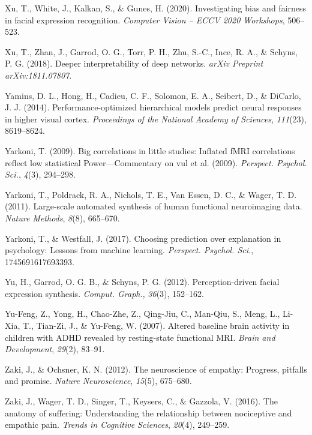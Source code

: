 \documentclass[11pt,american,a4paper,oneside,]{memoir} %
\begin{document}
\leavevmode\hypertarget{ref-Xu2020-jd}{}%
Xu, T., White, J., Kalkan, S., \& Gunes, H. (2020). Investigating bias and fairness in facial expression recognition. \emph{Computer Vision -- ECCV 2020 Workshops}, 506--523.

\leavevmode\hypertarget{ref-xu2018deeper}{}%
Xu, T., Zhan, J., Garrod, O. G., Torr, P. H., Zhu, S.-C., Ince, R. A., \& Schyns, P. G. (2018). Deeper interpretability of deep networks. \emph{arXiv Preprint arXiv:1811.07807}.

\leavevmode\hypertarget{ref-yamins2014performance}{}%
Yamins, D. L., Hong, H., Cadieu, C. F., Solomon, E. A., Seibert, D., \& DiCarlo, J. J. (2014). Performance-optimized hierarchical models predict neural responses in higher visual cortex. \emph{Proceedings of the National Academy of Sciences}, \emph{111}(23), 8619--8624.

\leavevmode\hypertarget{ref-Yarkoni2009-pz}{}%
Yarkoni, T. (2009). Big correlations in little studies: Inflated fMRI correlations reflect low statistical Power---Commentary on vul et al. (2009). \emph{Perspect. Psychol. Sci.}, \emph{4}(3), 294--298.

\leavevmode\hypertarget{ref-yarkoni2011large}{}%
Yarkoni, T., Poldrack, R. A., Nichols, T. E., Van Essen, D. C., \& Wager, T. D. (2011). Large-scale automated synthesis of human functional neuroimaging data. \emph{Nature Methods}, \emph{8}(8), 665--670.

\leavevmode\hypertarget{ref-Yarkoni2017-om}{}%
Yarkoni, T., \& Westfall, J. (2017). Choosing prediction over explanation in psychology: Lessons from machine learning. \emph{Perspect. Psychol. Sci.}, 1745691617693393.

\leavevmode\hypertarget{ref-Yu2012-ag}{}%
Yu, H., Garrod, O. G. B., \& Schyns, P. G. (2012). Perception-driven facial expression synthesis. \emph{Comput. Graph.}, \emph{36}(3), 152--162.

\leavevmode\hypertarget{ref-Yu-Feng2007-sg}{}%
Yu-Feng, Z., Yong, H., Chao-Zhe, Z., Qing-Jiu, C., Man-Qiu, S., Meng, L., Li-Xia, T., Tian-Zi, J., \& Yu-Feng, W. (2007). Altered baseline brain activity in children with ADHD revealed by resting-state functional MRI. \emph{Brain and Development}, \emph{29}(2), 83--91.

\leavevmode\hypertarget{ref-zaki2012neuroscience}{}%
Zaki, J., \& Ochsner, K. N. (2012). The neuroscience of empathy: Progress, pitfalls and promise. \emph{Nature Neuroscience}, \emph{15}(5), 675--680.

\leavevmode\hypertarget{ref-zaki2016anatomy}{}%
Zaki, J., Wager, T. D., Singer, T., Keysers, C., \& Gazzola, V. (2016). The anatomy of suffering: Understanding the relationship between nociceptive and empathic pain. \emph{Trends in Cognitive Sciences}, \emph{20}(4), 249--259.
\end{document}
